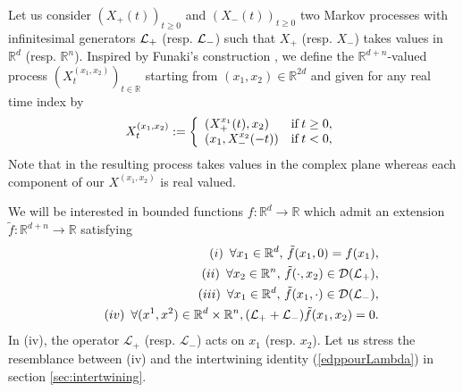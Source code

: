 \documentclass[a4paper, 11pt]{article}
\newcommand{\R}{\mathbb{R}}
\newcommand{\1}{\mathbf{1}}
\begin{document}
\medskip


\noindent Let us consider $(X_+(t))_{t\geq 0}$ and $(X_-(t))_{t\geq 0}$ two Markov processes with infinitesimal generators ${\cal L}_+$ (resp. ${\cal L}_-$) such that $X_+$ (resp. $X_-$) takes values in $\R^d$ (resp. $\R^n$). Inspired by Funaki's construction \cite{funaki}, we define the $\R^{d+n}$-valued process $(X^{(x_1,x_2)}_t)_{t\in \R}$  starting from $(x_1,x_2)\in \R^{2d}$ and given for any real time index by
\begin{equation}
\label{XindexeparR}
X^{(x_1,x_2)}_t:=\left\lbrace
\begin{array}{lcl} 
(X_+^{x_1}(t),x_2)& {\rm if} \, t\geq 0,\\ 
(x_1,X_-^{x_2}(-t))& {\rm if} \, t<0,
\end{array}\right.
\end{equation}
Note that in \cite{funaki} the resulting process takes values in the complex plane whereas each component of our $X^{(x_1,x_2)}$ is real valued.




\medskip

\noindent We will be interested in bounded functions $f:\R^d\rightarrow \R$ which admit an extension $\tilde{f}:\R^{d+n}\rightarrow \R$ satisfying
\begin{eqnarray}\label{extension}
&&(i)\,\, \,  \forall x_1\in \R^d,\,  \tilde{f}(x_1,0)=f(x_1),\\\
&&(ii)\,\, \,  \forall x_2\in \R^n,\, \tilde{f}(\cdot,x_2)\in {\cal D}({\cal L}_+),\nonumber\\
&&(iii)\,\, \, \forall x_1\in \R^d,\, \tilde{f}(x_1,\cdot)\in {\cal D}({\cal L}_-),\nonumber\\
&&(iv)\,\, \,  \forall (x^1,x^2)\in \R^d\times\R^n, (\mathcal{L_+}+\mathcal{L_-})\tilde{f}(x_1,x_2)=0.\nonumber
\end{eqnarray}
In (iv), the operator $\mathcal{L_+}$ (resp. $\mathcal{L_-}$) acts on $x_1$ (resp. $x_2$). Let us stress the resemblance between (iv) and the intertwining identity (\ref{edppourLambda}) in section \ref{sec:intertwining}.

\bigskip
\end{document}
